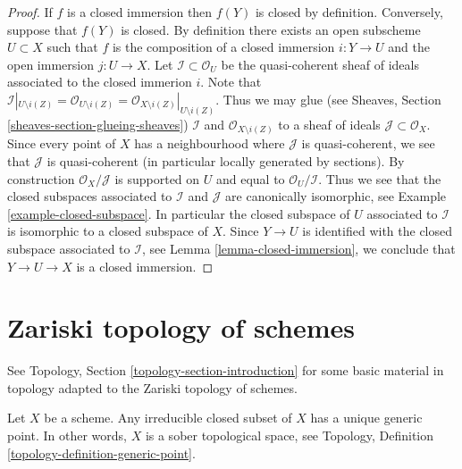 \begin{proof}
If $f$ is a closed immersion then $f(Y)$ is closed by definition.
Conversely, suppose that $f(Y)$ is closed. By definition
there exists an open subscheme $U \subset X$ such that $f$ is the composition
of a closed immersion $i : Y \to U$ and the open immersion
$j : U \to X$. Let $\mathcal{I} \subset \mathcal{O}_U$ be the 
quasi-coherent sheaf of ideals associated to the closed immerion
$i$. Note that
$\mathcal{I}|_{U \setminus i(Z)}
= \mathcal{O}_{U \setminus i(Z)}
= \mathcal{O}_{X \setminus i(Z)}|_{U \setminus i(Z)}$.
Thus we may glue (see Sheaves, Section \ref{sheaves-section-glueing-sheaves})
$\mathcal{I}$ and $\mathcal{O}_{X \setminus i(Z)}$ to a sheaf of
ideals $\mathcal{J} \subset \mathcal{O}_X$. Since every
point of $X$ has a neighbourhood where $\mathcal{J}$ is
quasi-coherent, we see that $\mathcal{J}$ is quasi-coherent
(in particular locally generated by sections).
By construction $\mathcal{O}_X/\mathcal{J}$ is supported
on $U$ and equal to $\mathcal{O}_U/\mathcal{I}$.
Thus we see that the closed subspaces associated to $\mathcal{I}$
and $\mathcal{J}$ are canonically isomorphic, see
Example \ref{example-closed-subspace}.
In particular the closed subspace of $U$ associated to $\mathcal{I}$
is isomorphic to a closed subspace of $X$.
Since $Y \to U$ is identified with the closed subspace
associated to $\mathcal{I}$, see Lemma \ref{lemma-closed-immersion},
we conclude that $Y \to U \to X$
is a closed immersion.
\end{proof}













\section{Zariski topology of schemes}
\label{section-topology}

\noindent
See Topology, Section \ref{topology-section-introduction}
for some basic material in topology adapted to the Zariski
topology of schemes.

\begin{lemma}
\label{lemma-scheme-sober}
Let $X$ be a scheme.
Any irreducible closed subset of $X$ has a unique generic point.
In other words, $X$ is a sober topological space, see
Topology, Definition \ref{topology-definition-generic-point}.
\end{lemma}

